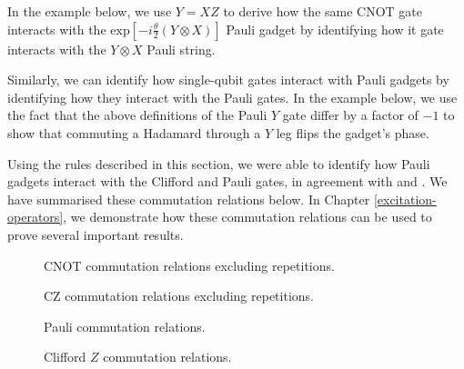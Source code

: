
In the example below, we use $Y=XZ$ to derive how the same $\text{CNOT}$ gate interacts with the $\text{exp} \left[ - i\frac{\theta}{2} \left(Y \otimes X \right) \right]$ Pauli gadget by identifying how it gate interacts with the $Y \otimes X$ Pauli string.


Similarly, we can identify how single-qubit gates interact with Pauli gadgets by identifying how they interact with the Pauli gates. In the example below, we use the fact that the above definitions of the Pauli $Y$ gate differ by a factor of $-1$ to show that commuting a Hadamard through a $Y$ leg flips the gadget's phase.


Using the rules described in this section, we were able to identify how Pauli gadgets interact with the Clifford and Pauli gates, in agreement with \cite{Yeung2020} and \cite{Cowtan2019}. We have summarised these commutation relations below. In Chapter \ref{excitation-operators}, we demonstrate how these commutation relations can be used to prove several important results.

\begin{figure}[H]
    \centering
    \caption{CNOT commutation relations excluding repetitions.}
    \label{cnot-commutations}
\end{figure}

\begin{figure}[H]
    \centering
    \caption{CZ commutation relations excluding repetitions.}
    \label{cz-commutations}
\end{figure}

\begin{figure}[H]
    \centering
    \caption{Pauli commutation relations.}
    \label{pauli-commutations}
\end{figure}

\begin{figure}[H]
    \centering
    \caption{Clifford $Z$ commutation relations.}
    \label{clifford-z-commutations}
\end{figure}

